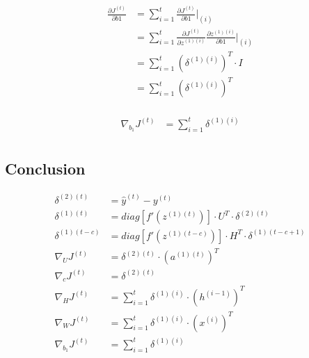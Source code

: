 \documentclass{article}
\begin{document}
	\begin{equation}
	\begin{aligned}
		\frac{\partial J^{(t)}}{\partial b1} &= \sum_{i=1}^{t} \frac{\partial J^{(t)}}{\partial b1}\bigg|_{(i)}  \\
		&= \sum_{i=1}^{t}
		\frac{\partial J^{(t)}}{\partial z^{(1)(i)}} 
		\frac{\partial z^{(1)(i)}}{\partial b1}\bigg|_{(i)} \\
		&= \sum_{i=1}^{t}
		(\delta^{(1)(i)})^T \cdot I \\
		&= \sum_{i=1}^{t} (\delta^{(1)(i)})^T\\
	\end{aligned}
	\end{equation}
	
	\begin{equation}
	\begin{aligned}
		\nabla_{b_1} J^{(t)} &= \sum_{i=1}^{t} \delta^{(1)(i)} \\
	\end{aligned}
	\end{equation}	
	
	\subsection{Conclusion}
	\begin{align}
		\delta^{(2)(t)} &= \hat{y}^{(t)} - y^{(t)} \\
		\delta^{(1)(t)} &= diag[f'(z^{(1)(t)})] \cdot U^T \cdot \delta^{(2)(t)}\\
		\delta^{(1)(t-c)} &= diag[f'(z^{(1)(t-c)})] \cdot H^T \cdot \delta^{(1)(t-c+1)}\\
		\nabla_U J^{(t)} &= \delta^{(2)(t)} \cdot (a^{(1)(t)})^T\\
		\nabla_{c} J^{(t)} &= \delta^{(2)(t)} \\
		\nabla_H J^{(t)} &= \sum_{i=1}^{t} \delta^{(1)(i)} \cdot  (h^{(i-1)})^T\\
		\nabla_W J^{(t)} &= \sum_{i=1}^{t} \delta^{(1)(i)} \cdot  (x^{(i)})^T\\
		\nabla_{b_1} J^{(t)} &= \sum_{i=1}^{t} \delta^{(1)(i)} \\
	\end{align}
	
	\newpage
\end{document}
